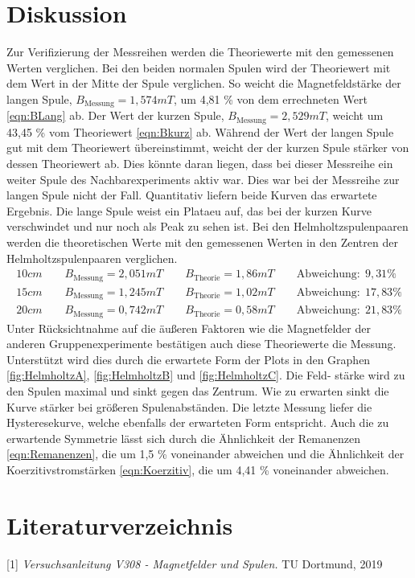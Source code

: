 \documentclass[titlepage = firstcover]{scrartcl}
\begin{document}
\section{Diskussion}
        Zur Verifizierung der Messreihen werden die Theoriewerte mit den gemessenen Werten verglichen. Bei den beiden normalen Spulen wird der Theoriewert mit
        dem Wert in der Mitte der Spule verglichen. So weicht die Magnetfeldstärke der langen Spule, $B_{\text{Messung}} = 1,574 mT$,  um 4,81 \% von dem errechneten Wert 
        \ref{eqn:BLang} ab. Der Wert der kurzen Spule, $B_{\text{Messung}} = 2,529 mT$, weicht um 43,45 \% vom Theoriewert \ref{eqn:Bkurz} ab. Während der Wert
        der langen Spule gut mit dem Theoriewert übereinstimmt, weicht der der kurzen Spule stärker von dessen Theoriewert ab. Dies könnte daran liegen, dass bei
        dieser Messreihe ein weiter Spule des Nachbarexperiments aktiv war. Dies war bei der Messreihe zur langen Spule nicht der Fall. Quantitativ liefern 
        beide Kurven das erwartete Ergebnis. Die lange Spule weist ein Plataeu auf, das bei der kurzen Kurve verschwindet und nur noch als Peak zu sehen ist.
        Bei den Helmholtzspulenpaaren werden die theoretischen Werte mit den gemessenen Werten in den Zentren der Helmholtzspulenpaaren verglichen.
        \begin{align*}
            10cm \qquad B_{\text{Messung}} = 2,051 mT \qquad B_{\text{Theorie}} = 1,86 mT \qquad \text{Abweichung}: \; 9,31 \% \\
            15cm \qquad B_{\text{Messung}} = 1,245 mT \qquad B_{\text{Theorie}} = 1,02 mT \qquad \text{Abweichung}: \; 17,83 \% \\
            20cm \qquad B_{\text{Messung}} = 0,742 mT \qquad B_{\text{Theorie}} = 0,58 mT \qquad \text{Abweichung}: \; 21,83 \% 
        \end{align*}
        Unter Rücksichtnahme auf die äußeren Faktoren wie die Magnetfelder der anderen Gruppenexperimente bestätigen auch diese Theoriewerte die Messung.
        Unterstützt wird dies durch die erwartete Form der Plots in den Graphen \ref{fig:HelmholtzA}, \ref{fig:HelmholtzB} und \ref{fig:HelmholtzC}. Die Feld-
        stärke wird zu den Spulen maximal und sinkt gegen das Zentrum. Wie zu erwarten sinkt die Kurve stärker bei größeren Spulenabständen.
        Die letzte Messung liefer die Hysteresekurve, welche ebenfalls der erwarteten Form entspricht. Auch die zu erwartende Symmetrie lässt sich durch die 
        Ähnlichkeit der Remanenzen \ref{eqn:Remanenzen}, die um 1,5 \% voneinander abweichen und die Ähnlichkeit der Koerzitivstromstärken \ref{eqn:Koerzitiv},
        die um 4,41 \% voneinander abweichen. 

\newpage
\section{Literaturverzeichnis}
        [1] \textit{Versuchsanleitung V308 - Magnetfelder und Spulen.} TU Dortmund, 2019
\end{document}
